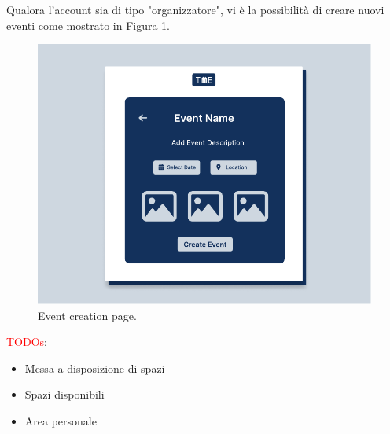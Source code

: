 \documentclass[9pt]{extarticle}
\begin{document}
Qualora l'account sia di tipo "organizzatore", vi è la possibilità di creare nuovi eventi come mostrato in Figura \ref{fig:eventCreation}.
\newpage

\begin{figure}[!htb]
	\centering
	\includegraphics[width=.7\linewidth]{./images/EventCreation.pdf}
	\caption{Event creation page.}
	\label{fig:eventCreation}
\end{figure}

\textcolor{red}{TODOs}:
\begin{itemize}
	\item Messa a disposizione di spazi
	\item Spazi disponibili
	\item Area personale
\end{itemize}
\end{document}
